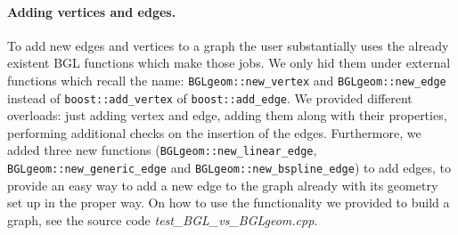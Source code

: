 \documentclass[10pt]{article} %
\begin{document}
	\paragraph{Adding vertices and edges.} To add new edges and vertices to a graph the user substantially uses the already existent BGL functions which make those jobs. We only hid them under external functions which recall the name: \texttt{BGLgeom::new\_vertex} and \texttt{BGLgeom::new\_edge} instead of \texttt{boost::add\_vertex} of \texttt{boost::add\_edge}. We provided different overloads: just adding vertex and edge, adding them along with their properties, performing additional checks on the insertion of the edges. Furthermore, we added three new functions (\texttt{BGLgeom::new\_linear\_edge}, \texttt{BGLgeom::new\_generic\_edge} and \texttt{BGLgeom::new\_bspline\_edge}) to add edges, to provide an easy way to add a new edge to the graph already with its geometry set up in the proper way.	On how to use the functionality we provided to build a graph, see the source code \textit{test\_BGL\_vs\_BGLgeom.cpp}.
	
\end{document}
